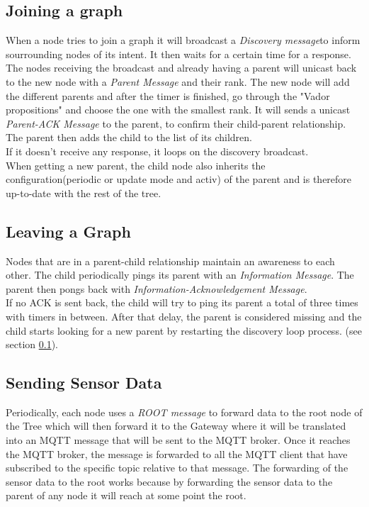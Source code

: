 \documentclass[a4paper,11pt]{article}
\begin{document}
\subsection{Joining a graph}
\label{sec: joining-graph}
When a node tries to join a graph it will broadcast a \textit{Discovery message}to inform sourrounding nodes of its intent. It then waits for a certain time for a response. The nodes receiving the broadcast and already having a parent will unicast back to the new node with a \textit{Parent Message} and their rank. The new node will add the different parents and after the timer is finished, go through the "Vador propositions" and choose the one with the smallest rank. It will sends a unicast \textit{Parent-ACK Message} to the parent, to confirm their child-parent relationship. The parent then adds the child to the list of its children.\\
If it doesn't receive any response, it loops on the discovery broadcast.\\
When getting a new parent, the child node also inherits the configuration(periodic or update mode and activ) of the parent and is therefore up-to-date with the rest of the tree.

\subsection{Leaving a Graph}
Nodes that are in a parent-child relationship maintain an awareness to each other. The child periodically pings its parent with an \textit{Information Message}. The parent then pongs back with \textit{Information-Acknowledgement Message}.\\
If no ACK is sent back, the child will try to ping its parent a total of three times with timers in between. After that delay, the parent is considered missing and the child starts looking for a new parent by restarting the discovery loop process. (see section \ref{sec: joining-graph}).

\subsection{Sending Sensor Data}
Periodically, each node uses a \textit{ROOT message} to forward data to the root node of the Tree which will then forward it to the Gateway where it will be translated into an MQTT message that will be sent to the MQTT broker. Once it reaches the MQTT broker, the message is forwarded to all the MQTT client that have subscribed to the specific topic relative to that message.
The forwarding of the sensor data to the root works because by forwarding the sensor data to the parent of any node it will reach at some point the root.
\end{document}
